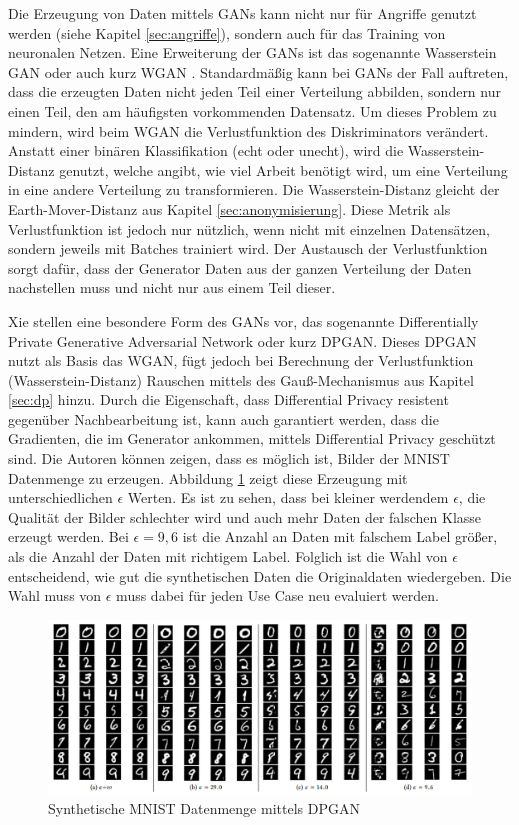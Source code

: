 Die Erzeugung von Daten mittels GANs kann nicht nur für Angriffe genutzt werden (siehe Kapitel \ref{sec:angriffe}), sondern auch für das Training von neuronalen Netzen.
Eine Erweiterung der GANs ist das sogenannte Wasserstein GAN oder auch kurz WGAN \cite{P-92}. 
Standardmäßig kann bei GANs der Fall auftreten, dass die erzeugten Daten nicht jeden Teil einer Verteilung abbilden, sondern nur einen Teil, \zB den am häufigsten vorkommenden Datensatz.
Um dieses Problem zu mindern, wird beim WGAN die Verlustfunktion des Diskriminators verändert. 
Anstatt einer binären Klassifikation (echt oder unecht), wird die Wasserstein-Distanz genutzt, welche angibt, wie viel Arbeit benötigt wird, um eine Verteilung in eine andere Verteilung zu transformieren. 
Die Wasserstein-Distanz gleicht der Earth-Mover-Distanz aus Kapitel \ref{sec:anonymisierung}.
Diese Metrik als Verlustfunktion ist jedoch nur nützlich, wenn nicht mit einzelnen Datensätzen, sondern jeweils mit Batches trainiert wird.
Der Austausch der Verlustfunktion sorgt dafür, dass der Generator Daten aus der ganzen Verteilung der Daten nachstellen muss und nicht nur aus einem Teil dieser.


Xie \etal \cite{P-70} stellen eine besondere Form des GANs vor, das sogenannte Differentially Private Generative Adversarial Network oder kurz DPGAN.
Dieses DPGAN nutzt als Basis das WGAN, fügt jedoch bei Berechnung der Verlustfunktion (Wasserstein-Distanz) Rauschen mittels des Gauß-Mechanismus aus Kapitel \ref{sec:dp} hinzu.
Durch die Eigenschaft, dass Differential Privacy resistent gegenüber Nachbearbeitung ist, kann auch garantiert werden, dass die Gradienten, die im Generator ankommen, mittels Differential Privacy geschützt sind.
Die Autoren können zeigen, dass es möglich ist, Bilder der MNIST Datenmenge \cite{D-MNIST} zu erzeugen.
Abbildung \ref{fig:dpgan} zeigt diese Erzeugung mit unterschiedlichen $\epsilon$ Werten.
Es ist zu sehen, dass bei kleiner werdendem $\epsilon$, die Qualität der Bilder schlechter wird und auch mehr Daten der falschen Klasse erzeugt werden. 
Bei $\epsilon=9,6$ ist die Anzahl an Daten mit falschem Label größer, als die Anzahl der Daten mit richtigem Label.
Folglich ist die Wahl von $\epsilon$ entscheidend, wie gut die synthetischen Daten die Originaldaten wiedergeben.
Die Wahl muss von $\epsilon$ muss dabei für jeden Use Case neu evaluiert werden.

\begin{figure}[!htb]
    \centering
    \includegraphics[width=\textwidth]{figures/dpgan}
    \caption{Synthetische MNIST Datenmenge mittels DPGAN \cite{P-70}}
    \label{fig:dpgan}
\end{figure} 

